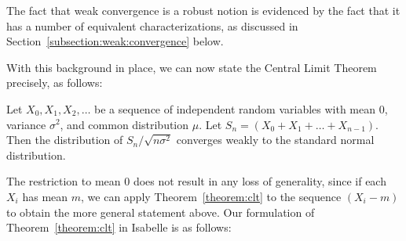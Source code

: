 \documentclass{svjour3}
\begin{document}
The fact that weak convergence is a robust notion is evidenced by the fact that it has a number of equivalent characterizations, as discussed in Section~\ref{subsection:weak:convergence} below.

With this background in place, we can now state the Central Limit Theorem precisely, as follows:
\begin{theorem}
\label{theorem:clt}
Let $X_0, X_1, X_2, \ldots$ be a sequence of independent random variables with mean $0$, variance $\sigma^2$, and common distribution $\mu$. Let $S_n = (X_0 + X_1 + \ldots + X_{n-1})$. Then the distribution of $S_n / \sqrt{n \sigma^2}$ converges weakly to the standard normal distribution.
\end{theorem}
The restriction to mean $0$ does not result in any loss of generality, since if each $X_i$ has mean $m$, we can apply Theorem~\ref{theorem:clt} to the sequence $(X_i - m)$ to obtain the more general statement above. Our formulation of Theorem~\ref{theorem:clt} in Isabelle is as follows:
\end{document}
